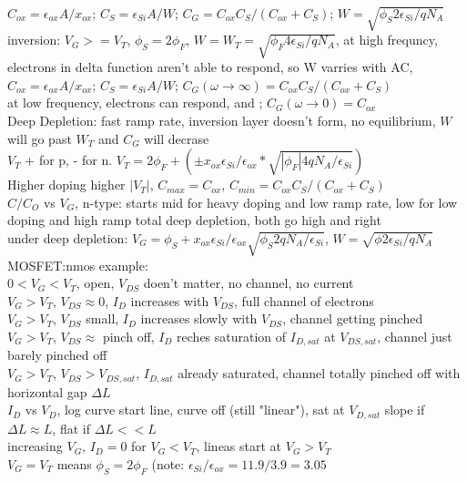 \documentclass{article}
\begin{document}
\begin{large}
\\$C_{ox}=\epsilon_{ox} A / x_{ox}$; $C_S=\epsilon_{Si} A / W$; $C_G=C_{ox}C_S/(C_{ox}+C_S)$; $W=\sqrt{\phi_S2\epsilon_{Si}/qN_A}$
\\inversion: $V_G>=V_T$, $\phi_S=2\phi_F$, $W=W_T=\sqrt{\phi_F4\epsilon_{Si}/qN_A}$, at high frequncy, electrons in delta function aren't able to respond, so W varries with AC, $C_{ox}=\epsilon_{ox} A / x_{ox}$; $C_S=\epsilon_{Si} A / W$; $C_G(\omega\rightarrow\infty)=C_{ox}C_S/(C_{ox}+C_S)$
\\at low frequency, electrons can respond, and ; $C_G(\omega\rightarrow0)=C_{ox}$
\\Deep Depletion: fast ramp rate, inversion layer doesn't form, no equilibrium, $W$ will go past $W_T$ and $C_G$ will decrase
\\$V_T$ + for p, - for n. $V_T=2\phi_F+(\pm x_{ox}\epsilon_{Si}/\epsilon_{ox} * \sqrt{|\phi_F|4qN_A/\epsilon_{Si}})$
\\Higher doping higher $|V_T|$, $C_{max}=C_{ox}$, $C_{min}=C_{ox}C_S/(C_{ox}+C_S)$
\\$C/C_O$ vs $V_G$, n-type: starts mid for heavy doping and low ramp rate, low for low doping and high ramp total deep depletion, both go high and right 
\\under deep depletion: $V_G=\phi_S+x_{ox}\epsilon_{Si}/\epsilon_{ox}\sqrt{\phi_S2qN_A/\epsilon_{Si}}$, $W=\sqrt{\phi2\epsilon_{Si}/qN_A}$
\\MOSFET:nmos example:
\\$0<V_G<V_T$, open, $V_{DS}$ doen't matter, no channel, no current
\\$V_G>V_T$, $V_{DS}\approx0$, $I_D$ increases with $V_{DS}$, full channel of electrons
\\$V_G>V_T$, $V_{DS}$ small, $I_D$ increases slowly with $V_{DS}$, channel getting pinched
\\$V_G>V_T$, $V_{DS}\approx$ pinch off, $I_D$ reches saturation of $I_{D,sat}$ at $V_{DS,sat}$, channel just barely pinched off
\\$V_G>V_T$, $V_{DS}>V_{DS,sat}$, $I_{D,sat}$ already saturated, channel totally pinched off with horizontal gap $\Delta L$
\\$I_D$ vs $V_D$, log curve start line, curve off (still "linear"), sat at $V_{D,sat}$ slope if $\Delta L\approx L$, flat if $\Delta L << L$
\\increasing $V_G$, $I_D=0$ for $V_G<V_T$, lineas start at $V_G>V_T$
\\$V_G=V_T$ means $\phi_S=2\phi_F$ (note: $\epsilon_{Si}/\epsilon_{ox}=11.9/3.9=3.05$

\end{large}
\end{document}

